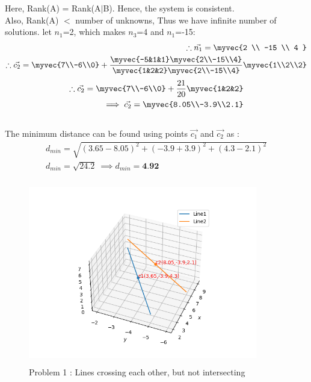 \documentclass[journal,12pt,twocolumn]{IEEEtran}
\begin{document}
Here, Rank(A) = Rank(A$\mid$B). Hence, the system is consistent. 
\\
Also, Rank(A) $<$ number of unknowns, Thus we have infinite number of solutions. let $n_1$=2, which makes $n_3$=4 and $n_1$=-15:
\begin{align}
\therefore \vec{n_1}=\myvec{2 \\ -15 \\ 4 }\\
\therefore \vec{c_2}= \myvec{7\\-6\\0}+\frac{\myvec{-5&1&1} \myvec{2\\-15\\4}}{\myvec{1&2&2} \myvec{2\\-15\\4}}\myvec{1\\2\\2}
\end{align}
\begin{align}
\therefore \vec{c_2}= \myvec{7\\-6\\0}+\frac{21}{20}\myvec{1&2&2}\\
\implies \vec{c_2}=\myvec{8.05\\-3.9\\2.1}
\end{align}
\\
The minimum distance can be found using points $\vec{c_1}$ and $\vec{c_2}$ as :
\begin{align}
    d_{min}=\sqrt{(3.65-8.05)^2+(-3.9+3.9)^2+(4.3-2.1)^2}\\
    d_{min}=\sqrt{24.2} \ \implies d_{min}=\textbf{4.92} 
\end{align}
\begin{figure}[h!]
\centering
\includegraphics[width=10cm, height=8cm]{Figure_1}
\caption{Problem 1 : Lines crossing each other, but not intersecting}
\label{Fig2}
\end{figure}
\end{document}
